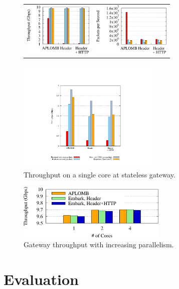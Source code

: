 \documentclass[letterpaper,twocolumn,10pt]{article}
\providecommand{\DIFdelend}{} %
\providecommand{\DIFaddbeginFL}{} %
\providecommand{\DIFaddendFL}{} %
\providecommand{\DIFdelbeginFL}{} %
\providecommand{\DIFdelendFL}{} %
\begin{document}
\DIFdelend %
\begin{figure}[t]
  \centering
  \begin{tabular}{cc}
  \DIFdelbeginFL %
\DIFdelendFL \DIFaddbeginFL \includegraphics[height=1in]{fig/gateway_xput}\DIFaddendFL &
  \includegraphics[height=1in]{fig/gateway_pps}\\
  \end{tabular}
  \includegraphics[width=2.75in]{fig/key}
  \caption[]{\label{fig:gwxput} Throughput on a single core at stateless gateway.}
\end{figure}

\begin{figure}[t]
  \centering
  \includegraphics[width=2.8in]{fig/gateway_scale}
  \caption[]{\label{fig:gwscale} Gateway throughput with increasing parallelism.}
\end{figure}

\section{Evaluation} \label{sec:eval}
\end{document}

